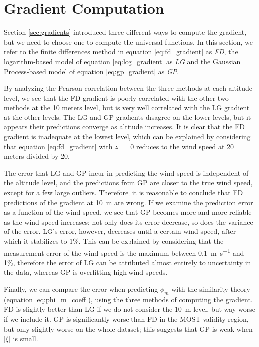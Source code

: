 \documentclass[a4paper,11pt]{kth-mag}
\begin{document}
\section{Gradient Computation}
\label{sec:res_gradient}
Section \ref{sec:gradients} introduced three different ways to compute the gradient, but we need to choose one to compute the universal functions. In this section, we refer to the finite differences method in equation \ref{eq:fd_gradient} as \emph{FD}, the logarithm-based model of equation \ref{eq:log_gradient} as \emph{LG} and the Gaussian Process-based model of equation \ref{eq:gp_gradient} as \emph{GP}.

By analyzing the Pearson correlation between the three methods at each altitude level, we see that the FD gradient is poorly correlated with the other two methods at the 10 meters level, but is very well correlated with the LG gradient at the other levels. The LG and GP gradients disagree on the lower levels, but it appears their predictions converge as altitude increases. It is clear that the FD gradient is inadequate at the lowest level, which can be explained by considering that equation \ref{eq:fd_gradient} with $z=10$ reduces to the wind speed at 20 meters divided by 20.

The error that LG and GP incur in predicting the wind speed is independent of the altitude level, and the predictions from GP are closer to the true wind speed, except for a few large outliers. Therefore, it is reasonable to conclude that FD predictions of the gradient at \SI{10}{\meter} are wrong. If we examine the prediction error as a function of the wind speed, we see that GP becomes more and more reliable as the wind speed increases; not only does its error decrease, so does the variance of the error. LG's error, however, decreases until a certain wind speed, after which it stabilizes to 1\%. This can be explained by considering that the measurement error of the wind speed is the maximum between \SI{0.1}{\meter\per\second} and 1\%, therefore the error of LG can be attributed almost entirely to uncertainty in the data, whereas GP is overfitting high wind speeds.

Finally, we can compare the error when predicting $\phi_m$ with the similarity theory (equation \ref{eq:phi_m_coeff}), using the three methods of computing the gradient. FD is slightly better than LG if we do not consider the \SI{10}{\meter} level, but way worse if we include it. GP is significantly worse than FD in the MOST validity region, but only slightly worse on the whole dataset; this suggests that GP is weak when $\vert\xi\vert$ is small. 
\end{document}
